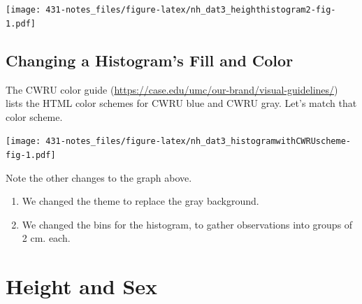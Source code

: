 \documentclass[
]{book}
\newenvironment{Shaded}{\begin{snugshade}}{\end{snugshade}}
\newcommand{\DataTypeTok}[1]{\textcolor[rgb]{0.13,0.29,0.53}{#1}}
\newcommand{\DecValTok}[1]{\textcolor[rgb]{0.00,0.00,0.81}{#1}}
\newcommand{\KeywordTok}[1]{\textcolor[rgb]{0.13,0.29,0.53}{\textbf{#1}}}
\newcommand{\NormalTok}[1]{#1}
\newcommand{\OperatorTok}[1]{\textcolor[rgb]{0.81,0.36,0.00}{\textbf{#1}}}
\newcommand{\StringTok}[1]{\textcolor[rgb]{0.31,0.60,0.02}{#1}}
\providecommand{\tightlist}{%
  \setlength{\itemsep}{0pt}\setlength{\parskip}{0pt}}
\begin{document}
\texttt{[image: 431-notes\_files/figure-latex/nh\_dat3\_heighthistogram2-fig-1.pdf]}

\hypertarget{changing-a-histograms-fill-and-color}{%
\subsection{Changing a Histogram's Fill and Color}\label{changing-a-histograms-fill-and-color}}

The CWRU color guide (\url{https://case.edu/umc/our-brand/visual-guidelines/}) lists the HTML color schemes for CWRU blue and CWRU gray. Let's match that color scheme.

\begin{Shaded}
\end{Shaded}

\texttt{[image: 431-notes\_files/figure-latex/nh\_dat3\_histogramwithCWRUscheme-fig-1.pdf]}

Note the other changes to the graph above.

\begin{enumerate}
\def\labelenumi{\arabic{enumi}.}
\tightlist
\item
  We changed the theme to replace the gray background.
\item
  We changed the bins for the histogram, to gather observations into groups of 2 cm. each.
\end{enumerate}

\hypertarget{height-and-sex}{%
\section{Height and Sex}\label{height-and-sex}}
\end{document}
